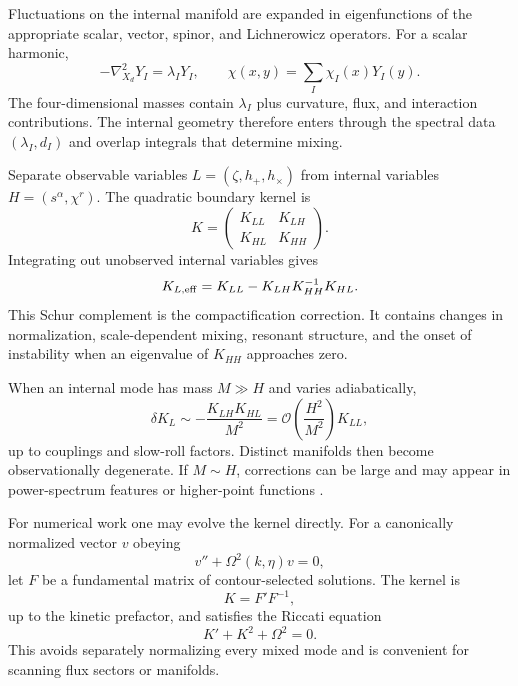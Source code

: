 \documentclass[aps,prd,twocolumn,superscriptaddress,nofootinbib,longbibliography,floatfix]{revtex4-2}
\begin{document}
Fluctuations on the internal manifold are expanded in eigenfunctions of the appropriate scalar, vector, spinor, and Lichnerowicz operators. For a scalar harmonic,
\begin{equation}
-\nabla_{X_d}^2Y_I=\lambda_IY_I,\qquad
\chi(x,y)=\sum_I\chi_I(x)Y_I(y).
\end{equation}
The four-dimensional masses contain $\lambda_I$ plus curvature, flux, and interaction contributions. The internal geometry therefore enters through the spectral data $(\lambda_I,d_I)$ and overlap integrals that determine mixing.

Separate observable variables $L=(\zeta,h_+,h_\times)$ from internal variables $H=(s^\alpha,\chi^r)$. The quadratic boundary kernel is
\begin{equation}
K=\begin{pmatrix}K_{LL}&K_{LH}\\K_{HL}&K_{HH}\end{pmatrix}.
\end{equation}
Integrating out unobserved internal variables gives
\begin{equation}
K_{L,\rm eff}=K_{LL}-K_{LH}K_{HH}^{-1}K_{HL}.
\label{eq:schur}
\end{equation}
This Schur complement is the compactification correction. It contains changes in normalization, scale-dependent mixing, resonant structure, and the onset of instability when an eigenvalue of $K_{HH}$ approaches zero.

When an internal mode has mass $M\gg H$ and varies adiabatically,
\begin{equation}
\delta K_L\sim-\frac{K_{LH}K_{HL}}{M^2}
=\mathcal O\left(\frac{H^2}{M^2}\right)K_{LL},
\end{equation}
up to couplings and slow-roll factors. Distinct manifolds then become observationally degenerate. If $M\sim H$, corrections can be large and may appear in power-spectrum features or higher-point functions \cite{ArkaniHamedMaldacena2015}.

For numerical work one may evolve the kernel directly. For a canonically normalized vector $v$ obeying
\begin{equation}
v''+\Omega^2(k,\eta)v=0,
\end{equation}
let $F$ be a fundamental matrix of contour-selected solutions. The kernel is
\begin{equation}
K=F'F^{-1},
\end{equation}
up to the kinetic prefactor, and satisfies the Riccati equation
\begin{equation}
K'+K^2+\Omega^2=0.
\label{eq:riccati}
\end{equation}
This avoids separately normalizing every mixed mode and is convenient for scanning flux sectors or manifolds.
\end{document}
